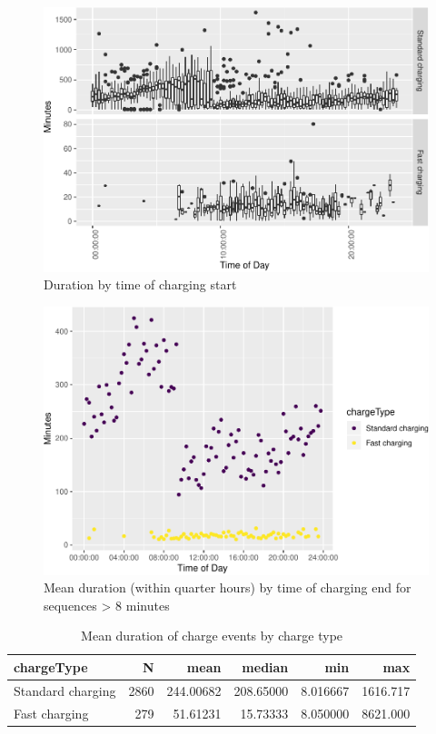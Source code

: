 \documentclass[]{article}
\begin{document}
\begin{figure}
\centering
\includegraphics{EVBB_report_files/figure-latex/durationTimeBox-1.pdf}
\caption{\label{fig:durationTimeBox}Duration by time of charging start}
\end{figure}

\begin{figure}
\centering
\includegraphics{EVBB_report_files/figure-latex/durationTimeMean-1.pdf}
\caption{\label{fig:durationTimeMean}Mean duration (within quarter hours) by
time of charging end for sequences \textgreater{} 8 minutes}
\end{figure}

\begin{table}[t]

\caption{\label{tab:meanDurationTable}Mean duration of charge events by charge type}
\centering
\begin{tabular}{l|r|r|r|r|r}
\hline
chargeType & N & mean & median & min & max\\
\hline
Standard charging & 2860 & 244.00682 & 208.65000 & 8.016667 & 1616.717\\
\hline
Fast charging & 279 & 51.61231 & 15.73333 & 8.050000 & 8621.000\\
\hline
\end{tabular}
\end{table}
\end{document}
